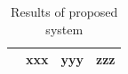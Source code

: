 \begin{table}[ht!]
\begin{tabular}{ | c | c | c | c |}
\begin{minipage}{.3\textwidth}
\begin{center}
      \end{center}
    \end{minipage}
    &
      xxx
    & 
      yyy
    & 
      zzz
    \\ \hline
  \end{tabular}
  \caption{Results of proposed system}\label{tbl:myLboro}
\end{table}

\bigskip




